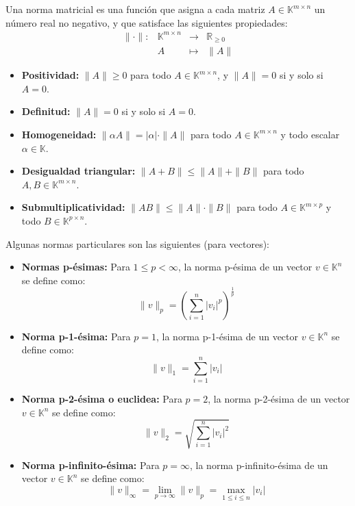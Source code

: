 \begin{definición}
    Una norma matricial es una función que asigna a cada matriz $ A \in \mathbb{K}^{m \times n} $ un número real no negativo, y que satisface las siguientes propiedades:
    \[
        \begin{array}{rccl}
            \|\cdot\| : & \mathbb{K}^{m \times n} & \to & \mathbb{R}_{\geq 0} \\
            & A & \mapsto & \|A\|
        \end{array}
    \]
    \begin{itemize}
        \item \textbf{Positividad:} $ \|A\| \geq 0 $ para todo $ A \in \mathbb{K}^{m \times n} $, y $ \|A\| = 0 $ si y solo si $ A = 0 $.
        \item \textbf{Definitud:} $ \|A\| = 0 $ si y solo si $ A = 0 $.
        \item \textbf{Homogeneidad:} $ \|\alpha A\| = |\alpha| \cdot \|A\| $ para todo $ A \in \mathbb{K}^{m \times n} $ y todo escalar $ \alpha \in \mathbb{K} $.
        \item \textbf{Desigualdad triangular:} $ \|A + B\| \leq \|A\| + \|B\| $ para todo $ A, B \in \mathbb{K}^{m \times n} $.
        \item \textbf{Submultiplicatividad:} $ \|AB\| \leq \|A\| \cdot \|B\| $ para todo $ A \in \mathbb{K}^{m \times p} $ y todo $ B \in \mathbb{K}^{p \times n} $.
    \end{itemize}
\end{definición}

Algunas normas particulares son las siguientes (para vectores):

\begin{itemize}
    \item \textbf{Normas p-ésimas:} Para $ 1 \leq p < \infty $, la norma p-ésima de un vector $ v \in \mathbb{K}^n $ se define como:
    \[
        \|v\|_p = \left( \sum_{i=1}^{n} |v_i|^p \right)^{\frac{1}{p}}
    \]
    \item \textbf{Norma p-1-ésima:} Para $p=1$, la norma p-1-ésima de un vector $ v \in \mathbb{K}^n $ se define como:
    \[
        \|v\|_1 = \sum_{i=1}^{n} |v_i|
    \]
    \item \textbf{Norma p-2-ésima o euclidea:} Para $p=2$, la norma p-2-ésima de un vector $ v \in \mathbb{K}^n $ se define como:
    \[
        \|v\|_2 = \sqrt{\sum_{i=1}^{n} |v_i|^2}
    \]
    \item \textbf{Norma p-infinito-ésima:} Para $p=\infty$, la norma p-infinito-ésima de un vector $ v \in \mathbb{K}^n $ se define como:
    \[
        \|v\|_\infty =
        \lim_{p \to \infty} \|v\|_p =
        \max_{1 \leq i \leq n} |v_i|
    \]
\end{itemize}

